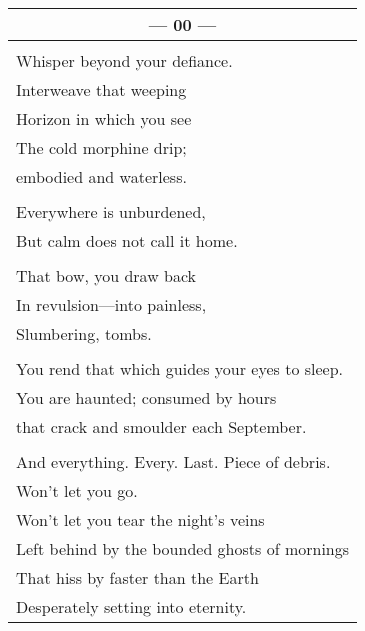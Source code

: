 \documentclass{article}
\begin{document}

\begin{center}
\begin{tabular}{l}
\multicolumn{1}{c}{\textbf{--- 00 ---}} \\ \hline
\\
Whisper beyond your defiance. \\
Interweave that weeping \\
Horizon in which you see \\
The cold morphine drip; \\
embodied and waterless. \\
\\
Everywhere is unburdened, \\
But calm does not call it home. \\
\\
That bow, you draw back \\
In revulsion---into painless, \\
Slumbering, tombs. \\ %
\\
You rend that which guides your eyes to sleep. \\
You are haunted; consumed by hours \\
that crack and smoulder each September. \\
\\
And everything. Every. Last. Piece of debris. \\
Won't let you go. \\
Won't let you tear the night's veins \\
Left behind by the bounded ghosts of mornings \\
That hiss by faster than the Earth \\
Desperately setting into eternity. \\
\end{tabular}
\end{center}

\newpage
\end{document}

